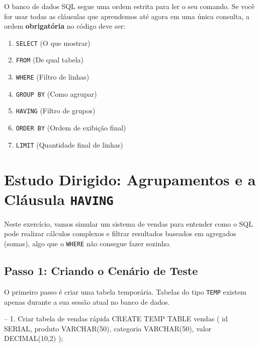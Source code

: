 \vspace{0.5cm}
\begin{tcolorbox}[colback=red!5,colframe=red!70!black,title=Atenção à Ordem de Execução!]
O banco de dados SQL segue uma ordem estrita para ler o seu comando. Se você for usar todas as cláusulas que aprendemos até agora em uma única consulta, a ordem \textbf{obrigatória} no código deve ser:
\begin{enumerate}
    \item \texttt{SELECT} (O que mostrar)
    \item \texttt{FROM} (De qual tabela)
    \item \texttt{WHERE} (Filtro de linhas)
    \item \texttt{GROUP BY} (Como agrupar)
    \item \texttt{HAVING} (Filtro de grupos)
    \item \texttt{ORDER BY} (Ordem de exibição final)
    \item \texttt{LIMIT} (Quantidade final de linhas)
\end{enumerate}
\end{tcolorbox}



\section{Estudo Dirigido: Agrupamentos e a Cláusula \texttt{HAVING}}

\begin{tcolorbox}[colback=green!5,colframe=green!40!black,title=Objetivo da Atividade]
Neste exercício, vamos simular um sistema de vendas para entender como o SQL pode realizar cálculos complexos e filtrar resultados baseados em agregados (somas), algo que o \texttt{WHERE} não consegue fazer sozinho.
\end{tcolorbox}

\subsection{Passo 1: Criando o Cenário de Teste}

O primeiro passo é criar uma tabela temporária. Tabelas do tipo \texttt{TEMP} existem apenas durante a sua sessão atual no banco de dados.

\begin{sqlcode}
-- 1. Criar tabela de vendas rápida
CREATE TEMP TABLE vendas (
    id SERIAL,
    produto VARCHAR(50),
    categoria VARCHAR(50),
    valor DECIMAL(10,2)
);
\end{sqlcode}


